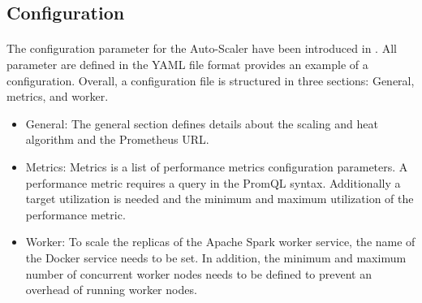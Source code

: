 \subsection{Configuration}
\paragraph{}The configuration parameter for the Auto-Scaler have been introduced in .
All parameter are defined in the YAML file format
 provides an example of a configuration.
Overall, a configuration file is structured in three sections: General, metrics, and worker.
\begin{itemize}
\item General:
The general section defines details about the scaling and heat algorithm and the Prometheus URL.

\item Metrics:
Metrics is a list of performance metrics configuration parameters. A performance metric requires a query in the PromQL syntax. Additionally a target utilization is needed and the minimum and maximum utilization of the performance metric.

\item Worker:
To scale the replicas of the Apache Spark worker service, the name of the Docker service needs to be set. In addition, the minimum and maximum number of concurrent worker nodes needs to be defined to prevent an overhead of running worker nodes.
\end{itemize}

